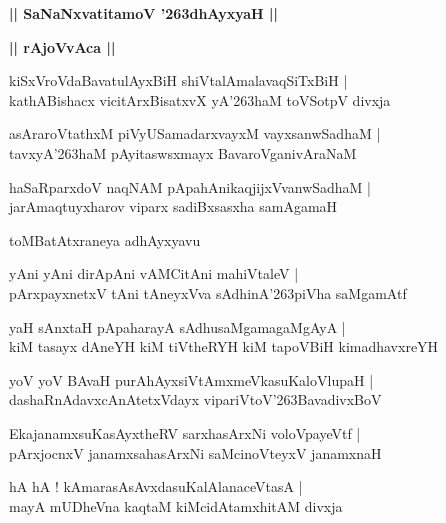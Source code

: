 \documentclass[twoside,12pt,openright]{book}
\def\S{\char'263}
\newcounter{shloka}[chapter]
\def\uvaca#1{\centerline{{\large\textbf{#1}}}}
\begin{document}
\begin{center}         
{\LARGE\bfseries || SaNaNxvatitamoV \S dhAyxyaH ||}
\end{center}

\uvaca{|| rAjoVvAca ||}

\begin{shloka}%
kiSxVroVdaBavatulAyxBiH shiVtalAmalavaqSiTxBiH |\\
kathABishacx vicitArxBisatxvX yA\S haM toVSotpV divxja 
\end{shloka}

\begin{shloka}%
asAraroVtathxM piVyUSamadarxvayxM vayxsanwSadhaM |\\
tavxyA\S haM pAyitaswsxmayx BavaroVganivAraNaM 
\end{shloka}

\begin{shloka}%
haSaRparxdoV naqNAM pApahAnikaqjijxVvanwSadhaM |\\
jarAmaqtuyxharov viparx sadiBxsasxha samAgamaH 
\end{shloka}

\begin{center}
toMBatAtxraneya adhAyxyavu
\end{center}

\begin{shloka}%
yAni yAni dirApAni vAMCitAni mahiVtaleV |\\
pArxpayxnetxV tAni tAneyxVva sAdhinA\S piVha saMgamAtf 
\end{shloka}

\begin{shloka}%
yaH sAnxtaH pApaharayA sAdhusaMgamagaMgAyA |\\
kiM tasayx dAneYH kiM tiVtheRYH kiM tapoVBiH kimadhavxreYH
\end{shloka}

\begin{shloka}%
yoV yoV BAvaH purAhAyxsiVtAmxmeVkasuKaloVlupaH |\\
dashaRnAdavxcAnAtetxVdayx vipariVtoV\S BavadivxBoV
\end{shloka}

\begin{shloka}%
EkajanamxsuKasAyxtheRV sarxhasArxNi voloVpayeVtf |\\
pArxjocnxV janamxsahasArxNi saMcinoVteyxV janamxnaH 
\end{shloka}

\begin{shloka}%
hA hA ! kAmarasAsAvxdasuKalAlanaceVtasA |\\
mayA mUDheVna kaqtaM kiMcidAtamxhitAM divxja 
\end{shloka}
\end{document}
